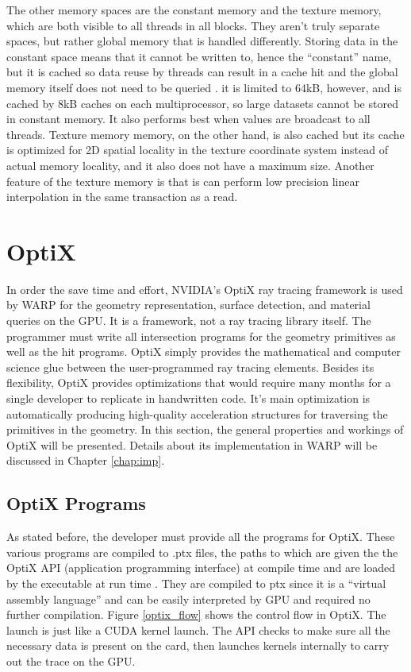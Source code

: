 The other memory spaces are the constant memory and the texture memory, which are both visible to all threads in all blocks.  They aren't truly separate spaces, but rather global memory that is handled differently.  Storing data in the constant space means that it cannot be written to, hence the ``constant'' name, but it is cached so data reuse by threads can result in a cache hit and the global memory itself does not need to be queried \cite{cuda}.  it is limited to 64kB, however, and is cached by 8kB caches on each multiprocessor, so large datasets cannot be stored in constant memory.  It also performs best when values are broadcast to all threads.  Texture memory memory, on the other hand, is also cached but its cache is optimized for 2D spatial locality in the texture coordinate system instead of actual memory locality, and it also does not have a maximum size.  Another feature of the texture memory is that is can perform low precision linear interpolation in the same transaction as a read.

\section{OptiX}

In order the save time and effort, NVIDIA's OptiX ray tracing framework is used by WARP for the geometry representation, surface detection, and material queries on the GPU.  It is a framework, not a ray tracing library itself.  The programmer must write all intersection programs for the geometry primitives as well as the hit programs.  OptiX simply provides the mathematical and computer science glue between the user-programmed ray tracing elements.  Besides its flexibility, OptiX provides optimizations that would require many months for a single developer to replicate in handwritten code.  It's main optimization is automatically producing high-quality acceleration structures for traversing the primitives in the geometry.  In this section, the general properties and workings of OptiX will be presented.  Details about its implementation in WARP will be discussed in Chapter \ref{chap:imp}.

\subsection{OptiX Programs}

As stated before, the developer must provide all the programs for OptiX.  These various programs are compiled to .ptx files, the paths to which are given the the OptiX API (application programming interface) at compile time and are loaded by the executable at run time \cite{optix}.  They are compiled to ptx since it is a ``virtual assembly language'' and can be easily interpreted by GPU and required no further compilation.  Figure \ref{optix_flow} shows the control flow in OptiX.  The launch is just like a CUDA kernel launch.  The API checks to make sure all the necessary data is present on the card, then launches kernels internally to carry out the trace on the GPU.


